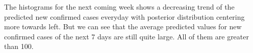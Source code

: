 \documentclass[]{article}
\begin{document}
The histograms for the next coming week shows a decreasing trend of the
predicted new confirmed cases everyday with posterior distribution
centering more towards left. But we can see that the average predicted
values for new confirmed cases of the next 7 days are still quite large.
All of them are greater than 100.
\end{document}
